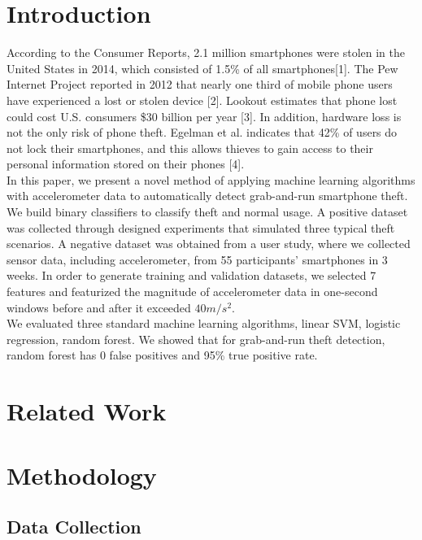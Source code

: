 \section{Introduction}

According to the Consumer Reports, 2.1 million smartphones were stolen in the United States in 2014, which consisted of 1.5\% of all smartphones[1]. The Pew Internet Project reported in 2012 that nearly one third of mobile phone users have experienced a lost or stolen device [2]. Lookout estimates that phone lost could cost U.S. consumers \$30 billion per year [3]. In addition, hardware loss is not the only risk of phone theft. Egelman et al. indicates that 42\% of users do not lock their smartphones, and this allows thieves to gain access to their personal information stored on their phones [4]. \\
In this paper, we present a novel method of applying machine learning algorithms with accelerometer data to automatically detect grab-and-run smartphone theft. We build binary classifiers to classify theft and normal usage. A positive dataset was collected through designed experiments that simulated three typical theft scenarios. A negative dataset was obtained from a user study, where we collected sensor data, including accelerometer, from 55 participants' smartphones in 3 weeks. In order to generate training and validation datasets, we selected 7 features and featurized the magnitude of accelerometer data in one-second windows before and after it exceeded $40m/s^2$. \\
We evaluated three standard machine learning algorithms, linear SVM, logistic regression, random forest. We showed that for grab-and-run theft detection, random forest has 0 false positives and 95\% true positive rate. 


\section{Related Work}



\section{Methodology}

\subsection{Data Collection}

